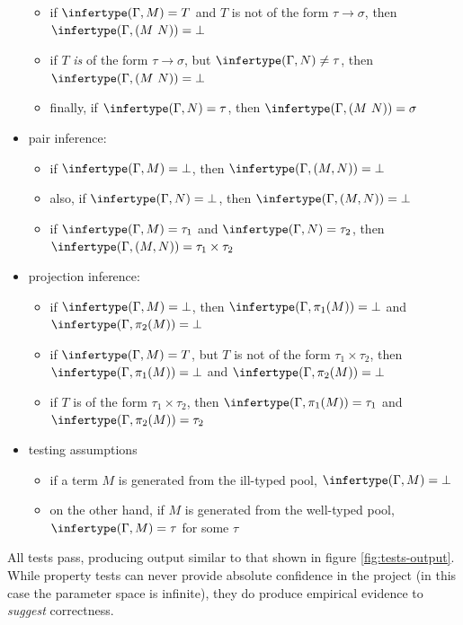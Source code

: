 \begin{itemize}
\begin{itemize}
\item if \(\infertype(\Gamma, M) = T\) and \(T\) is not of the form \(\tau \to \sigma\), then \(\infertype(\Gamma, (M\ N)) = \bot\)
\item if \(T\) \emph{is} of the form \(\tau \to \sigma\), but \(\infertype(\Gamma, N) \neq \tau\), then \(\infertype(\Gamma, (M\ N)) = \bot\)
\item finally, if \(\infertype(\Gamma, N) = \tau\), then \(\infertype(\Gamma, (M\ N)) = \sigma\)
\end{itemize}
\item pair inference:
\begin{itemize}
\item if \(\infertype(\Gamma, M) = \bot\), then \(\infertype(\Gamma, (M, N)) = \bot\)
\item also, if \(\infertype(\Gamma, N) = \bot\), then \(\infertype(\Gamma, (M, N)) = \bot\)
\item if \(\infertype(\Gamma, M) = \tau_1\) and \(\infertype(\Gamma, N) = \tau_2\), then \(\infertype(\Gamma, (M, N)) = \tau_1 \times \tau_2\)
\end{itemize}
\item projection inference:
\begin{itemize}
\item if \(\infertype(\Gamma, M) = \bot\), then \(\infertype(\Gamma, \pi_1(M)) = \bot\) and \(\infertype(\Gamma, \pi_2(M)) = \bot\)
\item if \(\infertype(\Gamma, M) = T\), but \(T\) is not of the form \(\tau_1 \times \tau_2\), then \(\infertype(\Gamma, \pi_1(M)) = \bot\) and \(\infertype(\Gamma, \pi_2(M)) = \bot\)
\item if \(T\) is of the form \(\tau_1 \times \tau_2\), then \(\infertype(\Gamma, \pi_1(M)) = \tau_1\) and \(\infertype(\Gamma, \pi_2(M)) = \tau_2\)
\end{itemize}
\item testing assumptions
\begin{itemize}
\item if a term \(M\) is generated from the ill-typed pool, \(\infertype(\Gamma, M) = \bot\)
\item on the other hand, if \(M\) is generated from the well-typed pool, \(\infertype(\Gamma, M) = \tau\) for some \(\tau\)
\end{itemize}
\end{itemize}

All tests pass, producing output similar to that shown in figure \ref{fig:tests-output}.
While property tests can never provide absolute confidence in the project (in this case the parameter space is infinite), they do produce empirical evidence to \emph{suggest} correctness.


